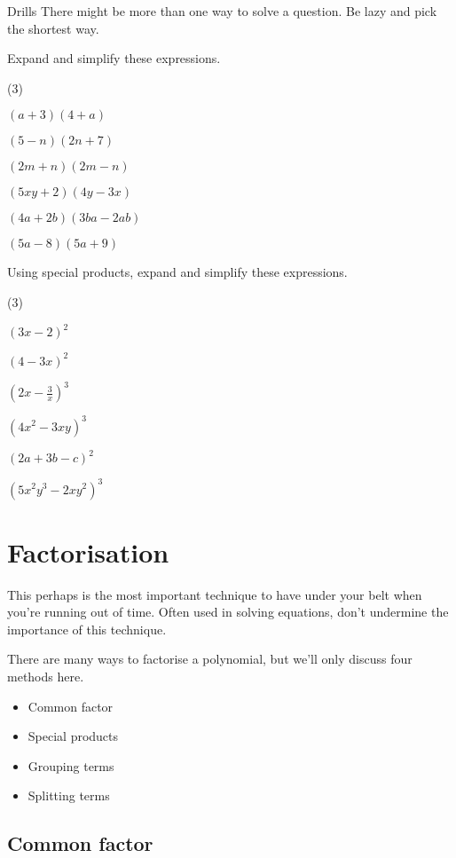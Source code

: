 \begin{questions}{Drills}
There might be more than one way to solve a question.
Be lazy and pick the shortest way.

Expand and simplify these expressions.
\begin{question_set}(3)
    \item $(a+3)(4+a)$
    \item $(5-n)(2n+7)$
    \item $(2m+n)(2m-n)$
    \item $(5xy+2)(4y-3x)$
    \item $(4a+2b)(3ba-2ab)$
    \item $(5a-8)(5a+9)$
\end{question_set}

Using special products, expand and simplify these expressions.
\begin{question_set}(3)
    \item $(3x-2)^{2}$
    \item $(4-3x)^{2}$
    \item $\left(2x-\frac {3}{x}\right)^{3}$
    \item $\left(4x^{2}-3xy\right)^{3}$
    \item $(2a+3b-c)^2$
    \item $\left(5x^{2}y^{3}-2xy^{2}\right)^{3}$
\end{question_set}
\end{questions}

\section{Factorisation}
This perhaps is the most important technique to have under your belt when you're running out of time. Often used in solving equations, don't undermine the importance of this technique.

There are many ways to factorise a polynomial, but we'll only discuss four methods here.
\begin{itemize}
    \item Common factor
    \item Special products
    \item Grouping terms
    \item Splitting terms
\end{itemize}


\subsection{Common factor}

